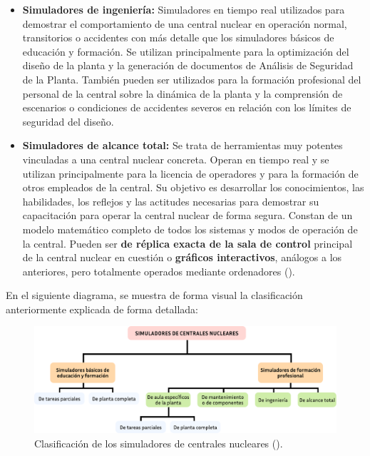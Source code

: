 \begin{enumerate}
\begin{itemize}
    \item \textbf{Simuladores de ingeniería:} Simuladores en tiempo real utilizados para demostrar el comportamiento de una central nuclear en operación normal, transitorios o accidentes con más detalle que los simuladores básicos de educación y formación. Se utilizan principalmente para la optimización del diseño de la planta y la generación de documentos de Análisis de Seguridad de la Planta. También pueden ser utilizados para la formación profesional del personal de la central sobre la dinámica de la planta y la comprensión de escenarios o condiciones de accidentes severos en relación con los límites de seguridad del diseño.
    \item \textbf{Simuladores de alcance total:} Se trata de herramientas muy potentes vinculadas a una central nuclear concreta. Operan en tiempo real y se utilizan principalmente para la licencia de operadores y para la formación de otros empleados de la central. Su objetivo es desarrollar los conocimientos, las habilidades, los reflejos y las actitudes necesarias para demostrar su capacitación para operar la central nuclear de forma segura. Constan de un modelo matemático completo de todos los sistemas y modos de operación de la central. Pueden ser \textbf{de réplica exacta de la sala de control} principal de la central nuclear en cuestión o \textbf{gráficos interactivos}, análogos a los anteriores, pero totalmente operados mediante ordenadores (\cite{international2019iaea}).
  \end{itemize}
\end{enumerate}

En el siguiente diagrama, se muestra de forma visual la clasificación anteriormente explicada de forma detallada:

\begin{figure}[h]
  \centering
  \includegraphics[width=\textwidth]{content/figures/clasificacion_simuladores.pdf}
  \caption{Clasificación de los simuladores de centrales nucleares (\cite{international2019iaea}).}
  \label{fig:clasificacion_simuladores}
\end{figure}

